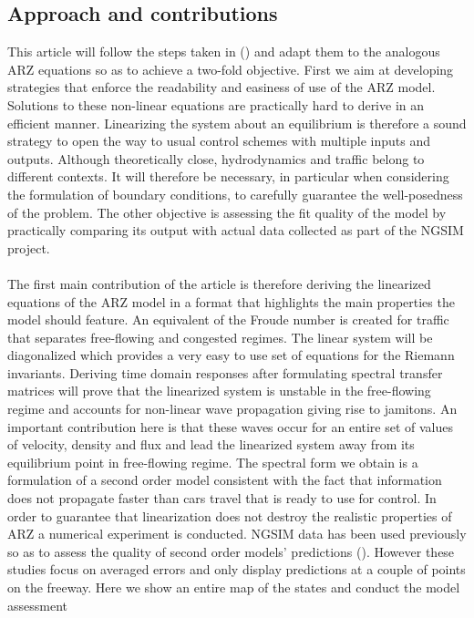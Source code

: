 \documentclass[preprint]{elsarticle}
\begin{document}
\subsection{Approach and contributions}
This article will follow the steps taken in (\cite{litrico2009modeling})
and adapt them to the analogous ARZ equations so as to achieve a two-fold
objective. First we aim at developing strategies that enforce the
readability and easiness of use of the ARZ model. Solutions to these
non-linear equations are practically hard to derive in an efficient
manner. Linearizing the system about an equilibrium is therefore a
sound strategy to open the way to usual control schemes with multiple
inputs and outputs. Although theoretically close, hydrodynamics and
traffic belong to different contexts. It will therefore be necessary,
in particular when considering the formulation of boundary conditions,
to carefully guarantee the well-posedness of the problem. The other
objective is assessing the fit quality of the model by practically
comparing its output with actual data collected as part of the NGSIM
project.\\
\\
The first main contribution of the article is therefore deriving the
linearized equations of the ARZ model in a format that highlights
the main properties the model should feature. An equivalent of the
Froude number is created for traffic that separates free-flowing and
congested regimes. The linear system will be diagonalized which provides
a very easy to use set of equations for the Riemann invariants. Deriving
time domain responses after formulating spectral transfer matrices
will prove that the linearized system is unstable in the free-flowing
regime and accounts for non-linear wave propagation giving rise to
jamitons. An important contribution here is that these waves occur
for an entire set of values of velocity, density and flux and lead
the linearized system away from its equilibrium point in free-flowing
regime. The spectral form we obtain is a formulation of a second order
model consistent with the fact that information does not propagate
faster than cars travel that is ready to use for control. In order
to guarantee that linearization does not destroy the realistic properties
of ARZ a numerical experiment is conducted. NGSIM data has been used
previously so as to assess the quality of second order models' predictions
(\cite{GodunovARZ,Fan}). However these studies focus on averaged
errors and only display predictions at a couple of points on the freeway.
Here we show an entire map of the states and conduct the model assessment
\end{document}
